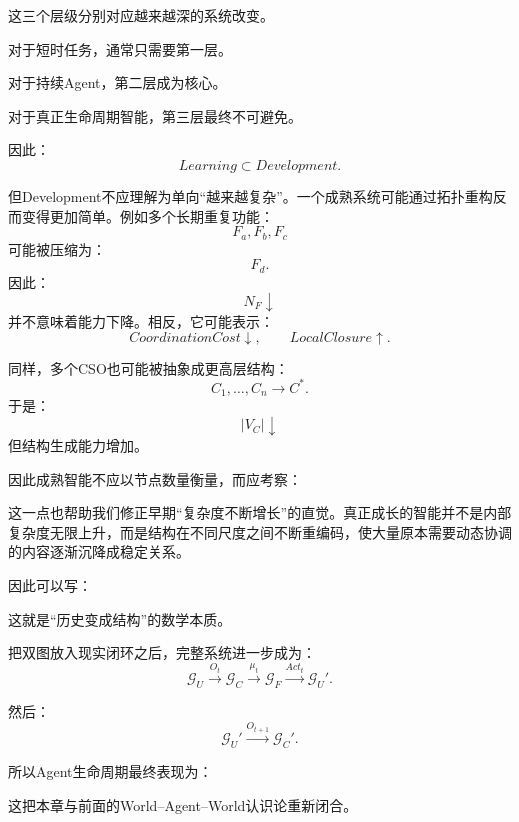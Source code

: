 这三个层级分别对应越来越深的系统改变。

对于短时任务，通常只需要第一层。

对于持续Agent，第二层成为核心。

对于真正生命周期智能，第三层最终不可避免。

因此：
\[
\boxed{
Learning
\subset
Development.
}
\]

但Development不应理解为单向“越来越复杂”。一个成熟系统可能通过拓扑重构反而变得更加简单。例如多个长期重复功能：
\[
F_a,F_b,F_c
\]
可能被压缩为：
\[
F_d.
\]
因此：
\[
N_F\downarrow
\]
并不意味着能力下降。相反，它可能表示：
\[
CoordinationCost\downarrow,
\qquad
LocalClosure\uparrow.
\]

同样，多个CSO也可能被抽象成更高层结构：
\[
C_1,\ldots,C_n
\rightarrow
C^\ast.
\]
于是：
\[
|V_C|\downarrow
\]
但结构生成能力增加。

因此成熟智能不应以节点数量衡量，而应考察：
\begin{statementbox}
\centering
{}
\end{statementbox}

这一点也帮助我们修正早期“复杂度不断增长”的直觉。真正成长的智能并不是内部复杂度无限上升，而是结构在不同尺度之间不断重编码，使大量原本需要动态协调的内容逐渐沉降成稳定关系。

因此可以写：
\begin{statementbox}
\centering
{}
\end{statementbox}

这就是“历史变成结构”的数学本质。

把双图放入现实闭环之后，完整系统进一步成为：
\[
\mathcal G_U
\xrightarrow{O_t}
\mathcal G_C
\xrightarrow{\mu_t}
\mathcal G_F
\xrightarrow{Act_t}
\mathcal G_U'.
\]

然后：
\[
\mathcal G_U'
\xrightarrow{O_{t+1}}
\mathcal G_C'.
\]

所以Agent生命周期最终表现为：
\begin{statementbox}
\centering
{}
\end{statementbox}

这把本章与前面的World--Agent--World认识论重新闭合。

